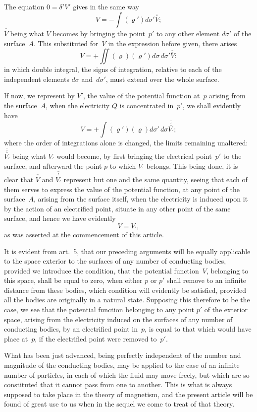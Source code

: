 \documentclass[12pt,notitlepage]{amsart}
\renewcommand{\rho}{\varrho}
\begin{document}
The equation $0=\delta'V'$ gives in the same way
\[
V=-\int(\rho')d\sigma'\overline{\overline{V}};
\]
$\overline{\overline{V}}$ being what $\overline{V}$ becomes
by bringing the point~$p'$ to any other element $d\sigma'$
of the surface~$A$. This substituted for~$\overline{V}$
in the expression before given,
there arises
\[
V=+\iint(\rho)(\rho')d\sigma\,d\sigma'\overline{\overline{V}}:
\]
in which double integral, the signs of integration, relative to each of the 
independent elements $d\sigma$ and~$d\sigma'$,
must extend over the whole surface.

If now, we represent by $V'$, the value of the potential function at~$p$
arising from the surface~$A$,
when the electricity $Q$ is concentrated in~$p'$, we
shall evidently have
\[
V=+\int(\rho')(\rho)d\sigma'\,
d\sigma\overline{\stackrel\prime{\overline{V_\prime}}};
\]
where the order of integrations alone is changed,
the limits remaining unaltered:
$\overline{\stackrel\prime{\overline{V_\prime}}}$ being
what $V_\prime$ would become, by first bringing the electrical point~$p'$ to
the surface, and afterward the point $p$ to which $V_\prime$ belongs.
This being done,
it is clear that $\overline{\overline{V}}$ and
$\overline{\stackrel\prime{\overline{V_\prime}}}$
represent but one and the same quantity, seeing
that each of them serves to express the value of the potential function, at
any point of the surface~$A$,
arising from the surface itself, when the electricity
is induced upon it by the action of an electrified point, situate in any other
point of the same surface, and hence we have evidently
\[
V=V_\prime,
\]
as was asserted at the commencement of this article.

It is evident from art.~5, that our preceding arguments will be equally
applicable to the space exterior to the surfaces of any number of conducting
bodies, provided we introduce the condition, that the potential function~$V$,
belonging to this space, shall be equal to zero, when either $p$ or $p'$ shall
remove to an infinite distance from these bodies, which condition will 
evidently be satisfied,
provided all the bodies are originally in a natural state.
Supposing this therefore to be the case, we see that the potential function
belonging to any point $p'$ of the exterior space, arising from the electricity
induced on the surfaces of any number of conducting bodies, by an electrified
point in~$p$, is equal to that which would have place at~$p$, if the electrified
point were removed to~$p'$.

What has been just advanced, being perfectly independent of the number
and magnitude of the conducting bodies, may be applied to the case of an 
infinite number of particles, in each of which the fluid may move freely, but
which are so constituted that it cannot pass from one to another. This is
what is always supposed to take place in the theory of magnetism, and the
present article will be found of great use to us when in the sequel we come
to treat of that theory.
\bigskip
\end{document}
